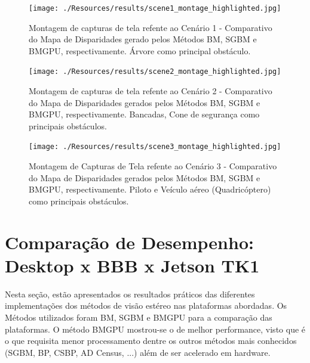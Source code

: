 \begin{figure}[H]
 	\centering
 	\texttt{[image: ./Resources/results/scene1\_montage\_highlighted.jpg]}
 	\caption{Montagem de capturas de tela refente ao Cenário 1 - Comparativo do Mapa de Disparidades gerado pelos Métodos BM, SGBM e BMGPU, respectivamente. Árvore como principal obstáculo.}
 	\label{scene1_montage}
\end{figure}

\begin{figure}[H]
 	\centering
 	\texttt{[image: ./Resources/results/scene2\_montage\_highlighted.jpg]}
 	\caption{Montagem de capturas de tela refente ao Cenário 2 - Comparativo do Mapa de Disparidades gerados pelos Métodos BM, SGBM e BMGPU, respectivamente. Bancadas, Cone de segurança como principais obstáculos.}
 	\label{scene2_montage}
\end{figure}

\begin{figure}[H]
 	\centering
 	\texttt{[image: ./Resources/results/scene3\_montage\_highlighted.jpg]}
 	\caption{Montagem de Capturas de Tela refente ao Cenário 3 - Comparativo do Mapa de Disparidades gerados pelos Métodos BM, SGBM e BMGPU, respectivamente. Piloto e Veículo aéreo (Quadricóptero) como principais obstáculos.}
 	\label{scene3_montage}
\end{figure}

\section{Comparação de Desempenho: Desktop x BBB x Jetson TK1}
\label{resultsComparison}

Nesta seção, estão apresentados os resultados práticos das diferentes implementações dos métodos de visão estéreo nas plataformas abordadas. Os Métodos utilizados foram BM, SGBM e BMGPU para a comparação das plataformas. O método BMGPU mostrou-se o de melhor performance, visto que é o que requisita menor processamento dentre os outros métodos mais conhecidos (SGBM, BP, CSBP, AD Census, ...) além de ser acelerado em hardware. 

